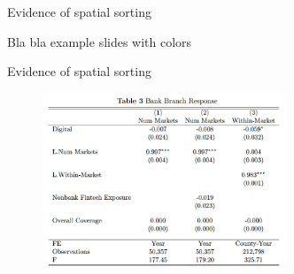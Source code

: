 \documentclass[notes,10pt, aspectratio=169]{beamer}
\newenvironment{wideitemize}{\itemize\addtolength{\itemsep}{10pt}}{\enditemize}
\begin{document}
\begin{frame}{Evidence of spatial sorting}


\begin{wideitemize}
\item Bla bla example slides with colors





\end{wideitemize}

\end{frame}

\begin{frame}{Evidence of spatial sorting}

\begin{figure}
    \centering
    \includegraphics[width=0.65\textwidth]{imgs/tab3.png}
\end{figure}

\end{frame}
\end{document}
